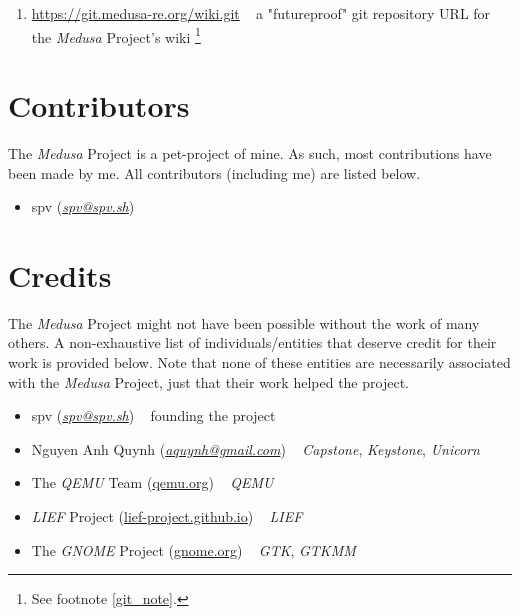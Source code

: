 \documentclass{article}
\newcommand{\Medusa}{\textit{Medusa}\xspace}
\begin{document}
\begin{enumerate}
		\item \href{https://www.gitlab.com/MedusaRE/wiki.git}{https://git.medusa-re.org/wiki.git}
		~ a "futureproof" git repository URL for the \Medusa Project's wiki
		\footnote{See footnote \ref{git_note}.}
	\end{enumerate}

	\section{Contributors}
	The \Medusa Project is a pet-project of mine. As such, most
	contributions have been made by me. All contributors (including me) are
	listed below.

	\begin{itemize}
		\item spv (\textit{\href{mailto:spv@spv.sh}{spv@spv.sh}})
	\end{itemize}

	\section{Credits}
	The \Medusa Project might not have been possible without the work of many
	others. A non-exhaustive list of individuals/entities that deserve credit
	for their work is provided below. Note that none of these entities are
	necessarily associated with the \Medusa Project, just that their work helped
	the project.

	\begin{itemize}
		\item spv (\textit{\href{mailto:spv@spv.sh}{spv@spv.sh}}) ~ founding the
		project

		\item Nguyen Anh Quynh
		(\textit{\href{mailto:aquynh@gmail.com}{aquynh@gmail.com}}) ~
		\textit{Capstone}, \textit{Keystone}, \textit{Unicorn}

		\item The \textit{QEMU} Team (\href{https://www.qemu.org}{qemu.org}) ~
		\textit{QEMU}

		\item \textit{LIEF} Project
		(\href{https://lief-project.github.io/}{lief-project.github.io}) ~
		\textit{LIEF}

		\item The \textit{GNOME} Project (\href{https://www.gnome.org}{gnome.org})
		~ \textit{GTK}, \textit{GTKMM}
	\end{itemize}
\end{document}
